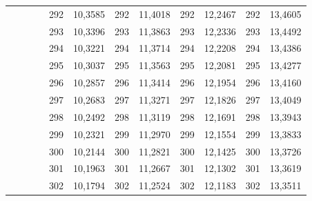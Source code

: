 \documentclass[a4paper,12pt]{article} %
\begin{document}
\begin{longtable}[c]{cccccccccc|c|c|}
	&  &  & \multicolumn{1}{c|}{} & \multicolumn{1}{c|}{292} & \multicolumn{1}{c|}{10,3585} & \multicolumn{1}{c|}{292} & \multicolumn{1}{c|}{11,4018} & \multicolumn{1}{c|}{292} & 12,2467 & 292 & 13,4605 \\ \cline{5-12} 
	&  &  & \multicolumn{1}{c|}{} & \multicolumn{1}{c|}{293} & \multicolumn{1}{c|}{10,3396} & \multicolumn{1}{c|}{293} & \multicolumn{1}{c|}{11,3863} & \multicolumn{1}{c|}{293} & 12,2336 & 293 & 13,4492 \\ \cline{5-12} 
	&  &  & \multicolumn{1}{c|}{} & \multicolumn{1}{c|}{294} & \multicolumn{1}{c|}{10,3221} & \multicolumn{1}{c|}{294} & \multicolumn{1}{c|}{11,3714} & \multicolumn{1}{c|}{294} & 12,2208 & 294 & 13,4386 \\ \cline{5-12} 
	&  &  & \multicolumn{1}{c|}{} & \multicolumn{1}{c|}{295} & \multicolumn{1}{c|}{10,3037} & \multicolumn{1}{c|}{295} & \multicolumn{1}{c|}{11,3563} & \multicolumn{1}{c|}{295} & 12,2081 & 295 & 13,4277 \\ \cline{5-12} 
	&  &  & \multicolumn{1}{c|}{} & \multicolumn{1}{c|}{296} & \multicolumn{1}{c|}{10,2857} & \multicolumn{1}{c|}{296} & \multicolumn{1}{c|}{11,3414} & \multicolumn{1}{c|}{296} & 12,1954 & 296 & 13,4160 \\ \cline{5-12} 
	&  &  & \multicolumn{1}{c|}{} & \multicolumn{1}{c|}{297} & \multicolumn{1}{c|}{10,2683} & \multicolumn{1}{c|}{297} & \multicolumn{1}{c|}{11,3271} & \multicolumn{1}{c|}{297} & 12,1826 & 297 & 13,4049 \\ \cline{5-12} 
	&  &  & \multicolumn{1}{c|}{} & \multicolumn{1}{c|}{298} & \multicolumn{1}{c|}{10,2492} & \multicolumn{1}{c|}{298} & \multicolumn{1}{c|}{11,3119} & \multicolumn{1}{c|}{298} & 12,1691 & 298 & 13,3943 \\ \cline{5-12} 
	&  &  & \multicolumn{1}{c|}{} & \multicolumn{1}{c|}{299} & \multicolumn{1}{c|}{10,2321} & \multicolumn{1}{c|}{299} & \multicolumn{1}{c|}{11,2970} & \multicolumn{1}{c|}{299} & 12,1554 & 299 & 13,3833 \\ \cline{5-12} 
	&  &  & \multicolumn{1}{c|}{} & \multicolumn{1}{c|}{300} & \multicolumn{1}{c|}{10,2144} & \multicolumn{1}{c|}{300} & \multicolumn{1}{c|}{11,2821} & \multicolumn{1}{c|}{300} & 12,1425 & 300 & 13,3726 \\ \cline{5-12} 
	&  &  & \multicolumn{1}{c|}{} & \multicolumn{1}{c|}{301} & \multicolumn{1}{c|}{10,1963} & \multicolumn{1}{c|}{301} & \multicolumn{1}{c|}{11,2667} & \multicolumn{1}{c|}{301} & 12,1302 & 301 & 13,3619 \\ \cline{5-12} 
	&  &  & \multicolumn{1}{c|}{} & \multicolumn{1}{c|}{302} & \multicolumn{1}{c|}{10,1794} & \multicolumn{1}{c|}{302} & \multicolumn{1}{c|}{11,2524} & \multicolumn{1}{c|}{302} & 12,1183 & 302 & 13,3511 \\ \cline{5-12} 

\end{longtable}
\end{document}
